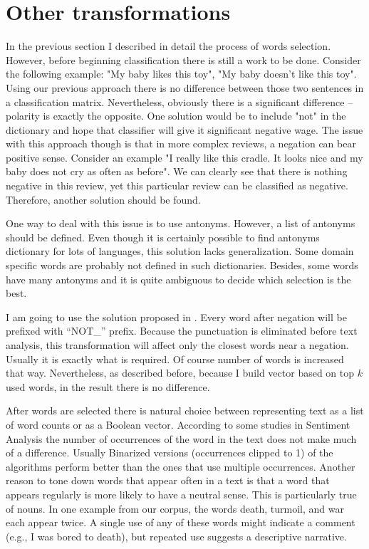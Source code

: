 \documentclass[12pt]{report}
\begin{document}
\newpage

\section{Other transformations}

In the previous section I described in detail the process of words selection.
However, before beginning classification there is still a work to be done. Consider the following example: "My baby likes this toy", "My baby doesn't like this toy". Using our previous approach there is no difference between those two sentences in a classification matrix. Nevertheless, obviously there is a significant difference – polarity is exactly the opposite. One solution would be to include "not" in the dictionary and hope that classifier will give it significant negative wage. The issue with this approach though is that in more complex reviews, a negation can bear positive sense. Consider an example "I really like this cradle. It looks nice and my baby does not cry as often as before". We can clearly see that there is nothing negative in this review, yet this particular review can be classified as negative. Therefore, another solution should be found.

One way to deal with this issue is to use antonyms. However, a list of antonyms should be defined. Even though it is certainly possible to find antonyms dictionary for lots of languages, this solution lacks generalization. Some domain specific words are probably not defined in such dictionaries. Besides, some words have many antonyms and it is quite ambiguous to decide which selection is the best.

I am going to use the solution proposed in \cite{Wake}. Every word after negation will be prefixed with “NOT\_” prefix. Because the punctuation is eliminated before text analysis, this transformation will affect only the closest words near a negation. Usually it is exactly what is required. Of course number of words is increased that way. Nevertheless, as described before, because I build vector based on top $k$ used words, in the result there is no difference.

After words are selected there is natural choice between representing text as a list of word counts or as a Boolean vector. According to some studies in Sentiment Analysis the number of occurrences of the word in the text does not make much of a difference. Usually Binarized versions (occurrences clipped to 1) of the algorithms perform better than the ones that use multiple occurrences.
Another reason to tone down words that appear often in a text is that a word that appears regularly is more likely to have a neutral sense. This is particularly true of nouns. In one example from our corpus, the words death, turmoil, and war each appear twice. A single use of any of these words might indicate a comment (e.g., I was bored to death), but repeated use suggests a descriptive narrative.
\end{document}
